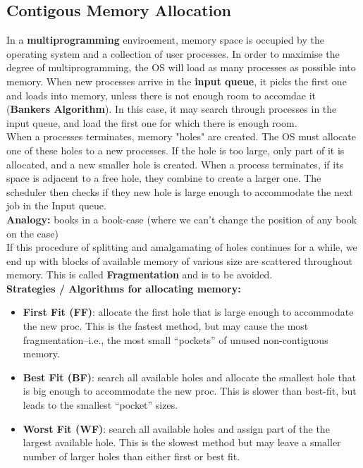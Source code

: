 \documentclass[a4paper, 10pt]{article}
\begin{document}
\subsection{Contigous Memory Allocation}
In a \textbf{multiprogramming} enviroement, memory space is occupied by the operating system and a collection of user processes. In order to maximise the degree of multiprogramming, the OS will load as many processes as possible into memory. When new processes arrive in the \textbf{input queue}, it picks the first one and loads into memory, unless there is not enough room to accomdae it (\textbf{Bankers Algorithm}).
In this case, it may search through processes in the input queue, and load the first one for which there is enough room. \\[2ex]
When a processes terminates, memory "holes" are created. The OS must allocate one of these holes to a new processes. If the hole is too large, only part of it is allocated, and a new smaller hole is created.  When a process terminates, if its space is adjacent to a free hole, they combine to create a larger one. The scheduler then checks if they new hole is large enough to
accommodate the next job in the Input queue. \\[2ex]
\textbf{Analogy:} books in a book-case (where we can't change the position of
any book on the case) \\[2ex]
If this procedure of splitting and amalgamating of holes continues for a while, we end up with blocks of available memory of various size are scattered throughout memory. This is called \textbf{Fragmentation} and is to be avoided.\\[2ex]
\textbf{Strategies / Algorithms for allocating memory:}
\begin{itemize}
    \item \textbf{First Fit (FF)}: allocate the first hole that is large enough to
          accommodate the new proc. This is the fastest method, but may
          cause the most fragmentation–i.e., the most small “pockets” of
          unused non-contiguous memory.
    \item \textbf{Best Fit (BF)}: search all available holes and allocate the smallest
          hole that is big enough to accommodate the new proc. This is
          slower than best-fit, but leads to the smallest “pocket” sizes.
    \item \textbf{Worst Fit (WF)}: search all available holes and assign part of the the
          largest available hole. This is the slowest method but may leave a
          smaller number of larger holes than either first or best fit.
\end{itemize}
\end{document}
